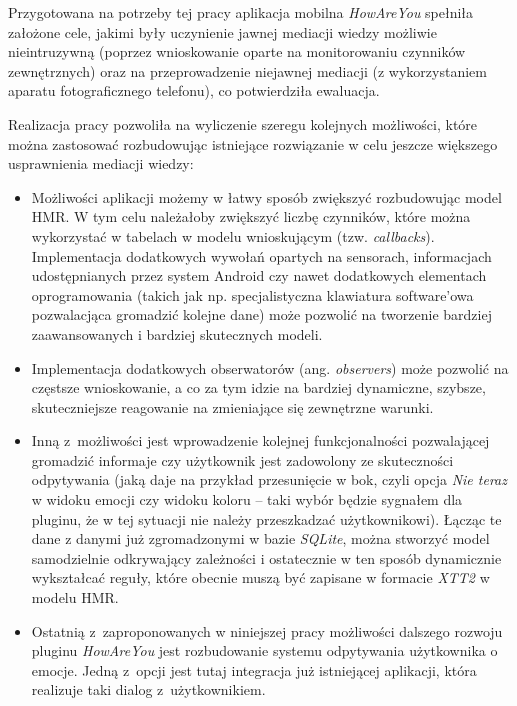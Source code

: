 Przygotowana na potrzeby tej pracy aplikacja mobilna \textit{HowAreYou} spełniła założone cele, jakimi były uczynienie jawnej mediacji wiedzy możliwie nieintruzywną (poprzez wnioskowanie oparte na monitorowaniu czynników zewnętrznych) oraz na przeprowadzenie niejawnej mediacji (z wykorzystaniem aparatu fotograficznego telefonu), co potwierdziła ewaluacja. 

Realizacja pracy pozwoliła na wyliczenie szeregu kolejnych możliwości, które można zastosować rozbudowując istniejące rozwiązanie w celu jeszcze większego usprawnienia mediacji wiedzy:

\begin{itemize}
	\item Możliwości aplikacji możemy w łatwy sposób zwiększyć rozbudowując model HMR. W tym celu należałoby zwiększyć liczbę czynników, które można wykorzystać w tabelach w modelu wnioskującym (tzw. \textit{callbacks}). Implementacja dodatkowych wywołań opartych na sensorach, informacjach udostępnianych przez system Android czy nawet dodatkowych elementach oprogramowania (takich jak np. specjalistyczna klawiatura software'owa pozwalacjąca gromadzić kolejne dane) może pozwolić na tworzenie bardziej zaawansowanych i bardziej skutecznych modeli.
	
	\item Implementacja dodatkowych obserwatorów (ang. \textit{observers}) może pozwolić na częstsze wnioskowanie, a co za tym idzie na bardziej dynamiczne, szybsze, skuteczniejsze reagowanie na zmieniające się zewnętrzne warunki.
	
	\item Inną z~możliwości jest wprowadzenie kolejnej funkcjonalności pozwalającej gromadzić informaje czy użytkownik jest zadowolony ze skuteczności odpytywania (jaką daje na przykład przesunięcie w bok, czyli opcja \textit{Nie teraz} w widoku emocji czy widoku koloru -- taki wybór będzie sygnałem dla pluginu, że w tej sytuacji nie należy przeszkadzać użytkownikowi). Łącząc te dane z danymi już zgromadzonymi w bazie \textit{SQLite}, można stworzyć model samodzielnie odkrywający zależności i ostatecznie w ten sposób dynamicznie wykształcać reguły, które obecnie muszą być zapisane w formacie \textit{XTT2} w modelu HMR.
	
	\item Ostatnią z~zaproponowanych w niniejszej pracy możliwości dalszego rozwoju pluginu \textit{HowAreYou} jest rozbudowanie systemu odpytywania użytkownika o emocje. Jedną z~opcji jest tutaj integracja już istniejącej aplikacji, która realizuje taki dialog z~użytkownikiem. 
	

\end{itemize}
